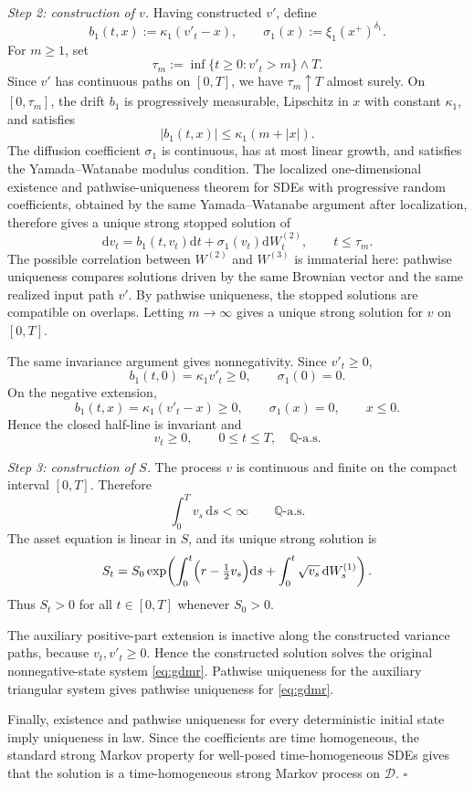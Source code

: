 \documentclass[pdflatex,sn-mathphys-num]{sn-jnl}
\theoremstyle{thmstyleone}%
\theoremstyle{thmstylethree}%
\theoremstyle{thmstyletwo}%
\newcommand{\dd}{\mathrm d}
\newcommand{\Q}{\mathbb Q}
\begin{document}
\begin{appendices}
\emph{Step 2: construction of $v$.}
Having constructed $v'$, define
$$
b_1(t,x):=\kappa_1(v'_t-x),\qquad
\sigma_1(x):=\xi_1(x^+)^{\delta_1}.
$$
For $m\ge1$, set
$$
\tau_m:=\inf\{t\ge0:v'_t>m\}\wedge T.
$$
Since $v'$ has continuous paths on $[0,T]$, we have $\tau_m\uparrow T$
almost surely. On $[0,\tau_m]$, the drift $b_1$ is progressively
measurable, Lipschitz in $x$ with constant $\kappa_1$, and satisfies
$$
|b_1(t,x)|\le\kappa_1(m+|x|).
$$
The diffusion coefficient $\sigma_1$ is continuous, has at most linear growth,
and satisfies the Yamada--Watanabe modulus condition. The localized
one-dimensional existence and pathwise-uniqueness theorem for SDEs with
progressive random coefficients, obtained by the same Yamada--Watanabe argument
after localization, therefore gives a unique strong stopped solution of
$$
\dd v_t=b_1(t,v_t)\dd t+\sigma_1(v_t)\dd W^{(2)}_t,
\qquad t\le\tau_m.
$$
The possible correlation between $W^{(2)}$ and $W^{(3)}$ is immaterial here:
pathwise uniqueness compares solutions driven by the same Brownian vector and
the same realized input path $v'$. By pathwise uniqueness, the stopped
solutions are compatible on overlaps. Letting $m\to\infty$ gives a unique
strong solution for $v$ on $[0,T]$.

The same invariance argument gives nonnegativity. Since $v'_t\ge0$,
$$
b_1(t,0)=\kappa_1v'_t\ge0,\qquad \sigma_1(0)=0.
$$
On the negative extension,
$$
b_1(t,x)=\kappa_1(v'_t-x)\ge0,\qquad
\sigma_1(x)=0,\qquad x\le0.
$$
Hence the closed half-line is invariant and
$$
v_t\ge0,\qquad 0\le t\le T,\quad \Q\text{-a.s.}
$$

\emph{Step 3: construction of $S$.}
The process $v$ is continuous and finite on the compact interval $[0,T]$.
Therefore
$$
\int_0^T v_s\,\dd s<\infty\qquad \Q\text{-a.s.}
$$
The asset equation is linear in $S$, and its unique strong solution is
$$
S_t
=S_0
\exp\!\left(
\int_0^t \Bigl(r-\tfrac12 v_s\Bigr)\dd s
+\int_0^t \sqrt{v_s}\,\dd W_s^{(1)}
\right).
$$
Thus $S_t>0$ for all $t\in[0,T]$ whenever $S_0>0$.

The auxiliary positive-part extension is inactive along the constructed variance
paths, because $v_t,v'_t\ge0$. Hence the constructed solution solves the
original nonnegative-state system \eqref{eq:gdmr}. Pathwise uniqueness for the
auxiliary triangular system gives pathwise uniqueness for \eqref{eq:gdmr}.

Finally, existence and pathwise uniqueness for every deterministic initial state
imply uniqueness in law. Since the coefficients are time homogeneous, the
standard strong Markov property for well-posed time-homogeneous SDEs gives that
the solution is a time-homogeneous strong Markov process on $\mathcal D$.
\hfill$\square$


\end{appendices}
\end{document}
